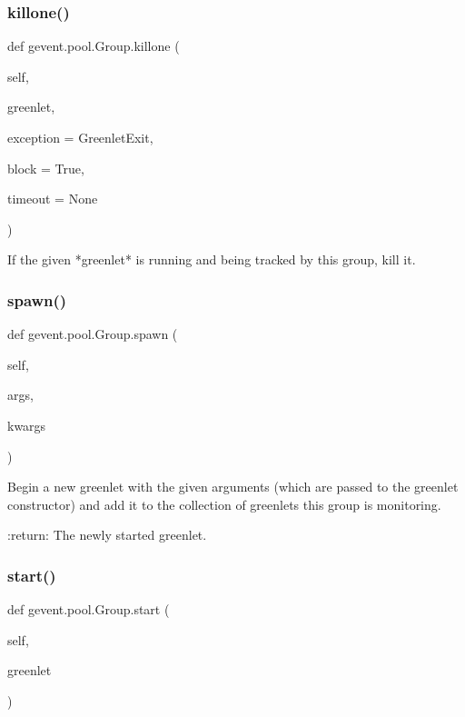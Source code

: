 \subsubsection{\texorpdfstring{killone()}{killone()}}
{\footnotesize\ttfamily def gevent.\+pool.\+Group.\+killone (\begin{DoxyParamCaption}\item[{}]{self,  }\item[{}]{greenlet,  }\item[{}]{exception = {\ttfamily GreenletExit},  }\item[{}]{block = {\ttfamily True},  }\item[{}]{timeout = {\ttfamily None} }\end{DoxyParamCaption})}

\begin{DoxyVerb}If the given *greenlet* is running and being tracked by this group,
kill it.
\end{DoxyVerb}
 \mbox{\label{classgevent_1_1pool_1_1_group_a17b15e843e0b151a3906c2f2c2167f55}} 
\subsubsection{\texorpdfstring{spawn()}{spawn()}}
{\footnotesize\ttfamily def gevent.\+pool.\+Group.\+spawn (\begin{DoxyParamCaption}\item[{}]{self,  }\item[{}]{args,  }\item[{}]{kwargs }\end{DoxyParamCaption})}

\begin{DoxyVerb}Begin a new greenlet with the given arguments (which are passed
to the greenlet constructor) and add it to the collection of greenlets
this group is monitoring.

:return: The newly started greenlet.
\end{DoxyVerb}
 \mbox{\label{classgevent_1_1pool_1_1_group_a50496ebf90113d8b8388e84b36be820d}} 
\subsubsection{\texorpdfstring{start()}{start()}}
{\footnotesize\ttfamily def gevent.\+pool.\+Group.\+start (\begin{DoxyParamCaption}\item[{}]{self,  }\item[{}]{greenlet }\end{DoxyParamCaption})}

